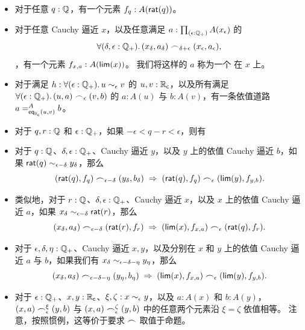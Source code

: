 \begin{itemize}
\item 对于任意 $q : \Q$，有一个元素 $f_q:A(\rcrat(q))$。
\item 对于任意 Cauchy 逼近 $x$，以及任意满足 $a:\prd{\epsilon:\Qp} A(x_\epsilon)$ 的 \begin{equation}
    \fall{\delta, \epsilon : \Qp}
    (x_\delta,a_\delta) \bsim_{\delta+\epsilon} (x_\epsilon,a_\epsilon),
    \label{eq:depCauchyappx}
  \end{equation}，有一个元素 $f_{x,a}:A(\rclim(x))$。
  我们将这样的 $a$ 称为一个
  在 $x$ 上。
\item 对于满足 $h:\fall{\epsilon : \Qp} u \close\epsilon v$ 的 $u, v : \RC$，以及所有满足 $\fall{\epsilon:\Qp} (u,a) \bsim_\epsilon (v,b)$ 的 $a:A(u)$ 与 $b:A(v)$，有一条依值道路 $\dpath{A}{\rceq(u,v)}{a}{b}$。
\item 对于 $q,r:\Q$ 和 $\epsilon:\Qp$，如果 $-\epsilon < q - r < \epsilon$，则有
\item 对于 $q:\Q$、$\delta,\epsilon:\Qp$、Cauchy 逼近 $y$，以及 $y$ 上的依值 Cauchy 逼近 $b$，如果 $\rcrat(q) \close{\epsilon - \delta} y_\delta$，那么
  \[(\rcrat(q),f_q) \bsim_{\epsilon-\delta} (y_\delta,b_\delta)
  \;\Rightarrow\;
  (\rcrat(q),f_q) \bsim_\epsilon (\rclim(y),f_{y,b}).\]
\item 类似地，对于 $r:\Q$、$\delta,\epsilon:\Qp$、Cauchy 逼近 $x$，以及 $x$ 上的依值 Cauchy 逼近 $a$，如果 $x_\delta \close{\epsilon - \delta} \rcrat(r)$，那么
  \[(x_\delta,a_\delta) \bsim_{\epsilon-\delta} (\rcrat(r),f_r)
  \;\Rightarrow\;
  (\rclim(x),f_{x,a}) \bsim_\epsilon (\rcrat(q),f_r).
  \]
\item 对于 $\epsilon,\delta,\eta:\Qp$、Cauchy 逼近 $x,y$，以及分别在 $x$ 和 $y$ 上的依值 Cauchy 逼近 $a$ 与 $b$，如果我们有 $x_\delta \close{\epsilon - \delta - \eta} y_\eta$，那么
  \[ (x_\delta,a_\delta) \bsim_{\epsilon - \delta - \eta} (y_\eta,b_\eta)
  \;\Rightarrow\;
  (\rclim(x),f_{x,a}) \bsim_\epsilon (\rclim(y),f_{y,b}).\]
\item 对于 $\epsilon:\Qp$、$x,y:\RC$、$\xi,\zeta:x\close{\epsilon} y$，以及 $a:A(x)$ 和 $b:A(y)$，$(x,a) \bsim_\epsilon^\xi (y,b)$ 与 $(x,a) \bsim_\epsilon^\zeta (y,b)$ 中的任意两个元素沿 $\xi=\zeta$ 依值相等。
  注意，按照惯例，这等价于要求 $\bsim$ 取值于命题。
\end{itemize}

